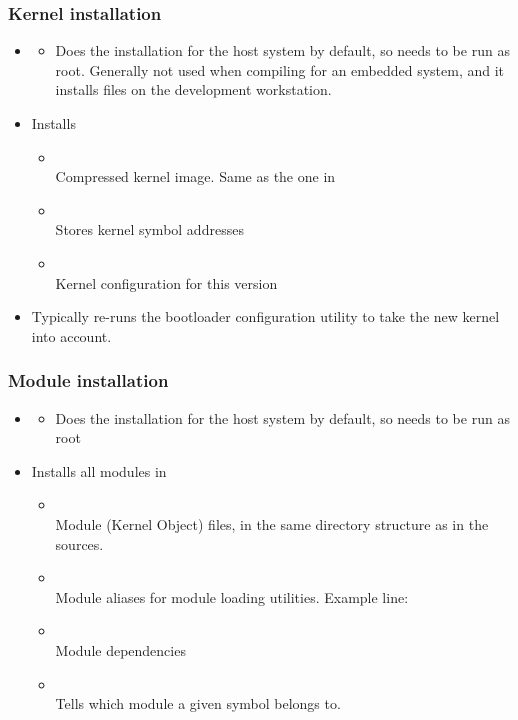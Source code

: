 \begin{frame}
  \frametitle{Kernel installation}
  \begin{itemize}
  \item {}
    \begin{itemize}
    \item Does the installation for the host system by default, so
      needs to be run as root. Generally not used when compiling for
      an embedded system, and it installs files on the development
      workstation.
    \end{itemize}
  \item Installs
    \begin{itemize}
    \item {} \\
      Compressed kernel image. Same as the one in
    \item {}\\
      Stores kernel symbol addresses
    \item {}\\
      Kernel configuration for this version
    \end{itemize}
  \item Typically re-runs the bootloader configuration utility to take
    the new kernel into account.
  \end{itemize}
\end{frame}

\begin{frame}
  \frametitle{Module installation}
  \begin{itemize}
  \item {}
    \begin{itemize}
    \item Does the installation for the host system by default, so
      needs to be run as root
    \end{itemize}
  \item Installs all modules in 
    \begin{itemize}
    \item {}\\
      Module  (Kernel Object) files, in the same directory
      structure as in the sources.
    \item {}\\
      Module aliases for module loading utilities. Example line:\\
    \item {}\\
      Module dependencies
    \item {}\\
      Tells which module a given symbol belongs to.
    \end{itemize}
  \end{itemize}
\end{frame}

